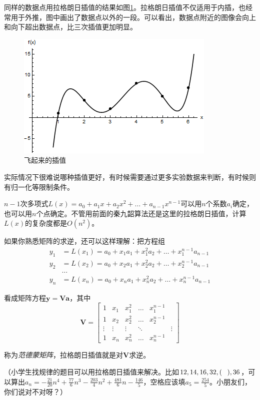 同样的数据点用拉格朗日插值的结果如图\ref{fig-disc-data-lag}。拉格朗日插值不仅适用于内插，也经常用于外推，图中画出了数据点以外的一段。可以看出，数据点附近的图像会向上和向下超出数据点，比三次插值更加明显。
\begin{figure}[htb]
\centering
\includegraphics[width=0.33\linewidth]{fig/disc-data-lag.png}
\caption{飞起来的插值}
\label{fig-disc-data-lag}
\end{figure}

实际情况下很难说哪种插值更好，有时候需要通过更多实验数据来判断，有时候则有归一化等限制条件。

$n-1$次多项式$L(x)=a_0+a_1 x+a_2 x^2+\dots+a_{n-1} x^{n-1}$可以用$n$个系数$a_i$确定，也可以用$n$个点确定。不管用前面的秦九韶算法还是这里的拉格朗日插值，计算$L(x)$的复杂度都是$O(n^2)$。

如果你熟悉矩阵的求逆，还可以这样理解：把方程组
\begin{align*}
y_1&=L(x_1)=a_0+x_1 a_1+x_1^2 a_2+\dots+x_1^{n-1} a_{n-1} \\
y_2&=L(x_2)=a_0+x_2 a_1+x_2^2 a_2+\dots+x_2^{n-1} a_{n-1} \\
&\dots \\
y_n&=L(x_n)=a_0+x_n a_1+x_n^2 a_2+\dots+x_n^{n-1} a_{n-1}
\end{align*}

看成矩阵方程$\mathbf{y}=\mathbf{V} \mathbf{a}$，其中
\begin{equation*}
\mathbf{V}=\begin{bmatrix}
1 & x_1 & x_1^2 & \dots & x_1^{n-1} \\
1 & x_2 & x_2^2 & \dots & x_2^{n-1} \\
\vdots & \vdots & \vdots & \ddots & & \vdots \\
1 & x_n & x_n^2 & \dots & x_n^{n-1}
\end{bmatrix}
\end{equation*}

称为\emph{范德蒙矩阵}，拉格朗日插值就是对$\mathbf{V}$求逆。

（小学生找规律的题目可以用拉格朗日插值来解决。比如$12,14,16,32,(\pheq),36$，可以算出$a_n=-\frac{21}{20} n^4+\frac{77}{6} n^3-\frac{203}{4} n^2+\frac{481}{6} n-\frac{146}{5}$，空格应该填$a_5=\frac{254}{5}$。小朋友们，你们说对不对呀？）
